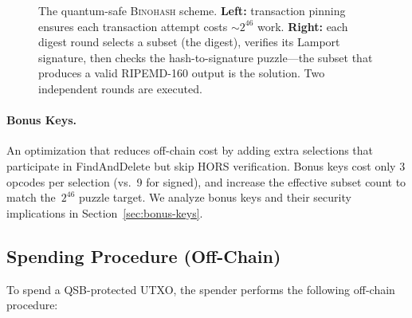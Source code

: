 \documentclass[11pt, a4paper]{article}
\begin{document}
\begin{figure}[H]
\caption{The quantum-safe \textsc{Binohash} scheme. \textbf{Left:} transaction pinning ensures each transaction attempt costs ${\sim}2^{46}$ work. \textbf{Right:} each digest round selects a subset (the digest), verifies its Lamport signature, then checks the hash-to-signature puzzle---the subset that produces a valid RIPEMD-160 output is the solution. Two independent rounds are executed.}
\label{fig:qs-scheme}
\end{figure}

\paragraph{Bonus Keys.}
An optimization that reduces off-chain cost by adding extra selections that participate in FindAndDelete but skip HORS verification. Bonus keys cost only 3 opcodes per selection (vs.\ 9 for signed), and increase the effective subset count to match the~$2^{46}$ puzzle target. We analyze bonus keys and their security implications in Section~\ref{sec:bonus-keys}.

\subsection{Spending Procedure (Off-Chain)}
\label{sec:spending-procedure}

To spend a QSB-protected UTXO, the spender performs the following off-chain procedure:
\end{document}
